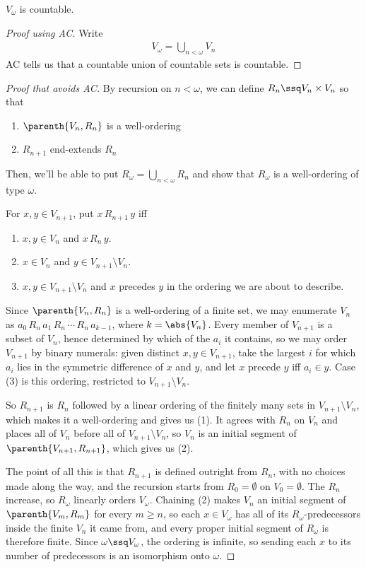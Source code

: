 \begin{boxproposition}
    $V_{\omega}$ is countable.
\end{boxproposition}
\begin{proof}[Proof using AC]
    Write
    \begin{align*}
        V_{\omega} = \bigcup_{n < \omega} V_n
    \end{align*}
    AC tells us that a countable union of countable sets is countable.
\end{proof}
\begin{proof}[Proof that avoids AC]
    By recursion on $n < \omega$, we can define $R_n \ssq V_n \times V_n$ so that
    \begin{enumerate}
        \item $\parenth{V_n, R_n}$ is a well-ordering
        \item $R_{n+1}$ end-extends $R_n$
    \end{enumerate}
    Then, we'll be able to put $R_{\omega} = \bigcup_{n < \omega} R_n$ and show that $R_{\omega}$ is a well-ordering of type $\omega$.

    For $x, y \in V_{n + 1}$, put $x \, R_{n+1} \, y$ iff
    \begin{enumerate}
        \item $x, y \in V_n$ and $x \, R_n \, y$.
        \item $x \in V_n$ and $y \in V_{n + 1} \setminus V_n$.
        \item $x, y \in V_{n+1} \setminus V_n$ and $x$ precedes $y$ in the ordering we are about to describe.
    \end{enumerate}
    Since $\parenth{V_n, R_n}$ is a well-ordering of a finite set, we may enumerate $V_n$ as $a_0 \, R_n \, a_1 \, R_n \, \cdots \, R_n \, a_{k-1}$, where $k = \abs{V_n}$. Every member of $V_{n+1}$ is a subset of $V_n$, hence determined by which of the $a_i$ it contains, so we may order $V_{n+1}$ by binary numerals: given distinct $x, y \in V_{n+1}$, take the largest $i$ for which $a_i$ lies in the symmetric difference of $x$ and $y$, and let $x$ precede $y$ iff $a_i \in y$. Case (3) is this ordering, restricted to $V_{n+1} \setminus V_n$.

    So $R_{n+1}$ is $R_n$ followed by a linear ordering of the finitely many sets in $V_{n+1} \setminus V_n$, which makes it a well-ordering and gives us (1). It agrees with $R_n$ on $V_n$ and places all of $V_n$ before all of $V_{n+1} \setminus V_n$, so $V_n$ is an initial segment of $\parenth{V_{n+1}, R_{n+1}}$, which gives us (2).

    The point of all this is that $R_{n+1}$ is defined outright from $R_n$, with no choices made along the way, and the recursion starts from $R_0 = \emptyset$ on $V_0 = \emptyset$. The $R_n$ increase, so $R_{\omega}$ linearly orders $V_{\omega}$. Chaining (2) makes $V_n$ an initial segment of $\parenth{V_m, R_m}$ for every $m \geq n$, so each $x \in V_{\omega}$ has all of its $R_{\omega}$-predecessors inside the finite $V_n$ it came from, and every proper initial segment of $R_{\omega}$ is therefore finite. Since $\omega \ssq V_{\omega}$, the ordering is infinite, so sending each $x$ to its number of predecessors is an isomorphism onto $\omega$.
\end{proof}

